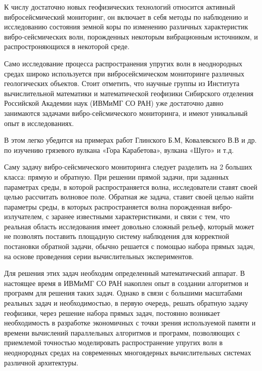 
К числу достаточно новых геофизических технологий относится активный вибросейсмический мониторинг, 
он включает в себя методы по наблюдению и исследованию состояния земной коры по изменению 
различных характеристик вибро-сейсмических волн, порожденных некоторым вибрационным источником, 
и распростроняющихся в некоторой среде. 

Само исследование процесса распространения упругих волн в неоднородных средах широко
используется при вибросейсмическом мониторинге различных геологических объектов.
Стоит отметить, что научные группы из Института
вычислительной математики и математической геофизики Сибирского
отделения Российской Академии наук (ИВМиМГ СО РАН) уже достаточно давно занимаются
задачами вибро-сейсмического мониторинга, и имеют уникальный опыт в исследованиях.

В этом легко убедится на примерах работ Глинского Б.М, Ковалевского В.В и др.
по изучению грязевого вулкана «Гора Карабетова», вулкана «Шуго» и т.д.

Саму задачу вибро-сейсмического мониторинга следует разделить на 2 больших класса: прямую и обратную.
При решении прямой задачи, при заданных параметрах среды, в которой распространяется волна, 
исследователи ставят своей целью рассчитать волновое поле. Обратная же задача, ставит своей целью найти параметры среды, 
в которых распространяется волна порожденная вибро-излучателем, с заранее известными характеристиками, 
и связи с тем, что реальная область исследования имеет довольно сложный рельеф,
который может не позволять поставить площадную систему наблюдения для корректной постановки обратной задачи,
обычно решается с помощью набора прямых задач, на основе проведения серии вычислительных
экспериментов.

Для решения этих задач необходим определенный математический аппарат. 
В настоящее время в ИВМиМГ СО РАН накоплен опыт в создании алгоритмов и программ для решения таких задач.
Однако в связи с большими масштабами реальных задач и необходимостью, в первую очередь, решать обратную
задачу геофизики, через решение набора прямых задач, постоянно возникает необходимость в
разработке экономичных с точки зрения используемой памяти и времени вычислений
параллельных алгоритмов и программ, позволяющих с приемлемой точностью
моделировать распространение упругих волн в неоднородных средах на 
современных многоядерных вычислительных системах различной архитектуры.

